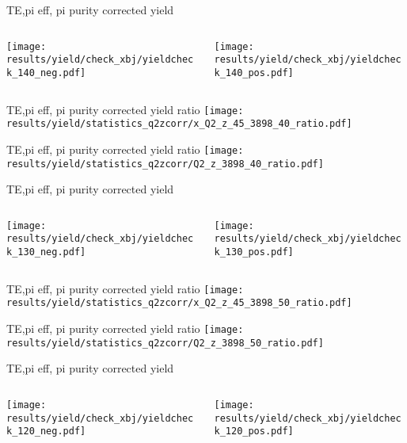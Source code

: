 \begin{frame}{TE,pi eff, pi purity corrected yield}
\begin{columns}
\begin{column}[T]{0.5\textwidth}
\texttt{[image: results/yield/check\_xbj/yieldcheck\_140\_neg.pdf]}
\end{column}
\begin{column}[T]{0.5\textwidth}
\texttt{[image: results/yield/check\_xbj/yieldcheck\_140\_pos.pdf]}
\end{column}
\end{columns}
\end{frame}
\begin{frame}{TE,pi eff, pi purity corrected yield ratio}
\texttt{[image: results/yield/statistics\_q2zcorr/x\_Q2\_z\_45\_3898\_40\_ratio.pdf]}
\end{frame}
\begin{frame}{TE,pi eff, pi purity corrected yield ratio}
\texttt{[image: results/yield/statistics\_q2zcorr/Q2\_z\_3898\_40\_ratio.pdf]}
\end{frame}
\begin{frame}{TE,pi eff, pi purity corrected yield}
\begin{columns}
\begin{column}[T]{0.5\textwidth}
\texttt{[image: results/yield/check\_xbj/yieldcheck\_130\_neg.pdf]}
\end{column}
\begin{column}[T]{0.5\textwidth}
\texttt{[image: results/yield/check\_xbj/yieldcheck\_130\_pos.pdf]}
\end{column}
\end{columns}
\end{frame}
\begin{frame}{TE,pi eff, pi purity corrected yield ratio}
\texttt{[image: results/yield/statistics\_q2zcorr/x\_Q2\_z\_45\_3898\_50\_ratio.pdf]}
\end{frame}
\begin{frame}{TE,pi eff, pi purity corrected yield ratio}
\texttt{[image: results/yield/statistics\_q2zcorr/Q2\_z\_3898\_50\_ratio.pdf]}
\end{frame}
\begin{frame}{TE,pi eff, pi purity corrected yield}
\begin{columns}
\begin{column}[T]{0.5\textwidth}
\texttt{[image: results/yield/check\_xbj/yieldcheck\_120\_neg.pdf]}
\end{column}
\begin{column}[T]{0.5\textwidth}
\texttt{[image: results/yield/check\_xbj/yieldcheck\_120\_pos.pdf]}
\end{column}
\end{columns}
\end{frame}

